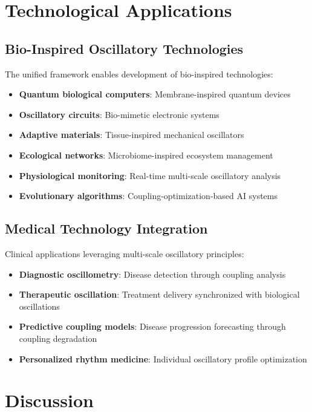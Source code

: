 \documentclass[twocolumn]{article}
\begin{document}
\section{Technological Applications}

\subsection{Bio-Inspired Oscillatory Technologies}

The unified framework enables development of bio-inspired technologies:

\begin{itemize}
\item \textbf{Quantum biological computers}: Membrane-inspired quantum devices
\item \textbf{Oscillatory circuits}: Bio-mimetic electronic systems
\item \textbf{Adaptive materials}: Tissue-inspired mechanical oscillators
\item \textbf{Ecological networks}: Microbiome-inspired ecosystem management
\item \textbf{Physiological monitoring}: Real-time multi-scale oscillatory analysis
\item \textbf{Evolutionary algorithms}: Coupling-optimization-based AI systems
\end{itemize}

\subsection{Medical Technology Integration}

Clinical applications leveraging multi-scale oscillatory principles:

\begin{itemize}
\item \textbf{Diagnostic oscillometry}: Disease detection through coupling analysis
\item \textbf{Therapeutic oscillation}: Treatment delivery synchronized with biological oscillations
\item \textbf{Predictive coupling models}: Disease progression forecasting through coupling degradation
\item \textbf{Personalized rhythm medicine}: Individual oscillatory profile optimization
\end{itemize}

\section{Discussion}
\end{document}
